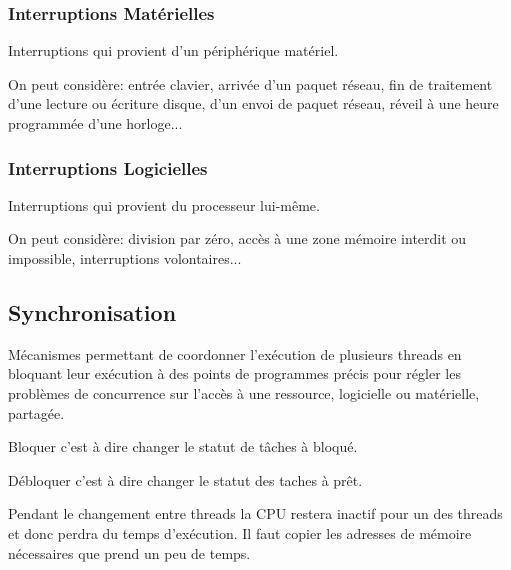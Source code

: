 \documentclass{article}
\begin{document}
\subsubsection{Interruptions Matérielles}
\begin{definition}
    Interruptions qui provient d'un périphérique matériel.

    \begin{example}
        On peut considère: entrée clavier, arrivée d'un paquet réseau, fin de traitement d'une lecture ou écriture disque, d'un envoi de paquet réseau, réveil à une heure programmée d'une horloge...
    \end{example}
\end{definition}

\subsubsection{Interruptions Logicielles}
\begin{definition}
    Interruptions qui provient du processeur lui-même.

    \begin{example}
        On peut considère: division par zéro, accès à une zone mémoire interdit ou impossible, interruptions volontaires...
    \end{example}
\end{definition}


\subsection{Synchronisation}
\begin{definition}\label{def:synchronisation}
    Mécanismes permettant de coordonner l'exécution de plusieurs threads en bloquant leur exécution à des points de programmes précis pour régler les problèmes de concurrence sur l'accès à une ressource, logicielle ou matérielle, partagée.

    \begin{remark}
        Bloquer c'est à dire changer le statut de tâches à bloqué.
    \end{remark}
    \begin{remark}
        Débloquer c'est à dire changer le statut des taches à prêt.
    \end{remark}

    Pendant le changement entre threads la CPU restera inactif pour un des threads et donc perdra du temps d'exécution. Il faut copier les adresses de mémoire nécessaires que prend un peu de temps.
\end{definition}
\end{document}
